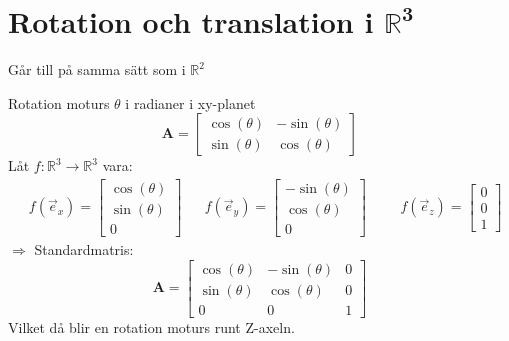 \section{Rotation och translation i $\mathbf{\mathbb{R}^3}$} %
\label{sec:rotation_och_translation_i_}
Går till på samma sätt som i $\mathbb{R}^2$
\begin{Ex}
    Rotation moturs $\theta$ i radianer i xy-planet
    \[
        \mathbf{A} = \begin{bmatrix} \cos(\theta)&-\sin(\theta)\\\sin(\theta)&\cos(\theta) \end{bmatrix}
    \]
    Låt $f: \mathbb{R}^3 \rightarrow \mathbb{R}^3$ vara:
    \begin{align*}
    &f(\vec{e}_x) = \begin{bmatrix} \cos(\theta)\\\sin(\theta)\\0 \end{bmatrix}
    &&f(\vec{e}_y) = \begin{bmatrix} -\sin(\theta)\\\cos(\theta)\\0 \end{bmatrix}
    &&&f(\vec{e}_z) = \begin{bmatrix} 0\\0\\1 \end{bmatrix}
    \end{align*}
    $\Rightarrow$ Standardmatris:
    \[
        \mathbf{A} = \begin{bmatrix} \cos(\theta)&-\sin(\theta)&0\\\sin(\theta)&\cos(\theta)&0\\0&0&1 \end{bmatrix}
    \]
    Vilket då blir en rotation moturs runt Z-axeln.
\end{Ex}



